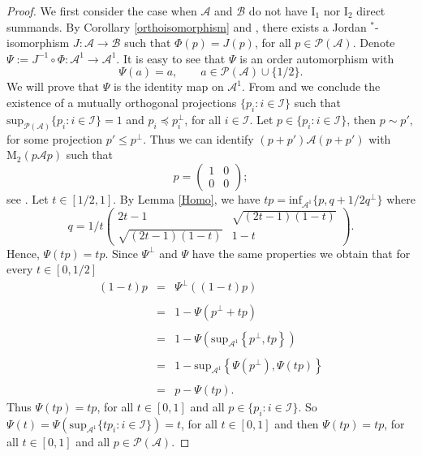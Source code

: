 \documentclass[12pt]{amsart}
\theoremstyle{definition}
\theoremstyle{remark}
\numberwithin{equation}{section}
\begin{document}
\begin{proof}
We first  consider the case when $\mathcal{A}$ and $\mathcal{B}$ do not have $\mathrm{I}_1$ nor $\mathrm{I}_2$ direct summands. By  Corollary \ref{orthoisomorphism} and \cite[Theorem 4.3]{Hamhalter}, there exists a Jordan $^*$-isomorphism $J:\mathcal{A}\to\mathcal{B}$ such that    $\Phi(p)=J(p)$, for all $p\in\mathcal{P(A)}$.  Denote $\Psi:=J^{-1}\circ \Phi:\mathcal{A}^1\to\mathcal{A}^1$. It is easy to see that $\Psi$ is an order automorphism  with $$\Psi(a)=a, \qquad  a\in\mathcal{P(A)}\cup \{1/2\}.$$	
We will prove that $\Psi$  	is the identity map on $\mathcal{A}^1$.  From \cite[Lemma 4.12]{Kaplansky} and \cite[Theorem 4, p. 116]{Berberian} we conclude the existence of a mutually orthogonal projections $\{p_i:i\in \mathcal{I}\}$ such that $\mathrm{sup}_{\mathcal{P(A)}}\{p_i:i\in \mathcal{I}\}=1$ and $p_i\preceq p_i^\perp$, for all $i\in \mathcal{I}$. Let $p\in   \{p_i:i\in \mathcal{I}\}$, then $p\sim p'$, for some projection $p'\leq p^\perp$. Thus we can identify $(p+p')\mathcal{A}(p+p')$ with $\mathrm{M}_2(p\mathcal{A}p)$ such that  $$p=\begin{pmatrix}
	1 & 0\\
	0 & 0
\end{pmatrix};$$
see \cite[Proposition 1, p. 98]{Berberian}.
Let $t\in[1/2,1]$. By Lemma \ref{Homo}, we have  $tp=\mathrm{inf}_{\mathcal{A}^1}\{p,q+1/2q^\perp\}$ where $$q=1/t\begin{pmatrix}
	2t-1 & 	\sqrt{(2t-1)(  1-t)}\\
	\sqrt{(2t-1)( 1-t)} & 1-t
\end{pmatrix}.$$
Hence, $\Psi(tp)=tp$.  Since  $\Psi^\perp$  and $\Psi$ have the same  properties we obtain that for every $t\in[0,1/2]$ $$\begin{array}{lllll}
	(1-t)p	&=&\Psi^\perp((1-t)p)\\\\
	&=& 1-\Psi \left(p^\perp+tp\right) \\ \\
	&=& 1-\Psi\left( \mathrm{sup}_{\mathcal{A}^1}\left\lbrace p^{\perp},tp\right\rbrace \right) \\ \\
	&=&1-\mathrm{sup}_{\mathcal{A}^1}\left\lbrace \Psi(p^{\perp}),\Psi(tp) \right\rbrace  \\ \\
	&=&p-\Psi(tp).
\end{array}$$
Thus $\Psi(tp)=tp$, for all $t\in[0,1]$ and all $p\in \{p_i:i\in \mathcal{I}\}$. So $\Psi(t)=\Psi\left( \mathrm{sup}_{\mathcal{A}^1}\{tp_i:i\in \mathcal{I}\}\right)=t $, for all $t\in [0,1]$ and then $\Psi(tp)=tp$, for all $t\in[0,1]$ and all $p\in \mathcal{P(A)}$. 


\end{proof}
\end{document}
